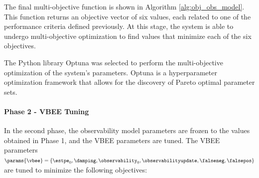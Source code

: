 The final multi-objective function is shown in Algorithm \ref{alg:obj_obs_model}. This function returns an objective vector of six values, each related to one of the performance criteria defined previously. At this stage, the system is able to undergo multi-objective optimization to find values that minimize each of the six objectives.

\begin{singlespace}
    \begin{algorithm}[H]
        \caption{Observability Model Objective Function}
        \label{alg:obj_obs_model}
        \begin{algorithmic}
            \EndFunction
        \end{algorithmic}
    \end{algorithm}
\end{singlespace}

The Python library Optuna \cite{akibaOptunaNextgenerationHyperparameter2019} was selected to perform the multi-objective optimization of the system's parameters. Optuna is a hyperparameter optimization framework that allows for the discovery of Pareto optimal \cite{censorParetoOptimalityMultiobjective1977} parameter sets.

\paragraph{Phase 2 - VBEE Tuning}

In the second phase, the observability model parameters are frozen to the values obtained in Phase 1, and the VBEE parameters are tuned. The VBEE parameters $\params{\vbee} = \{\estpe_0, \damping, \observability_0, \observabilityupdate, \falseneg, \falsepos\}$ are tuned to minimize the following objectives:
